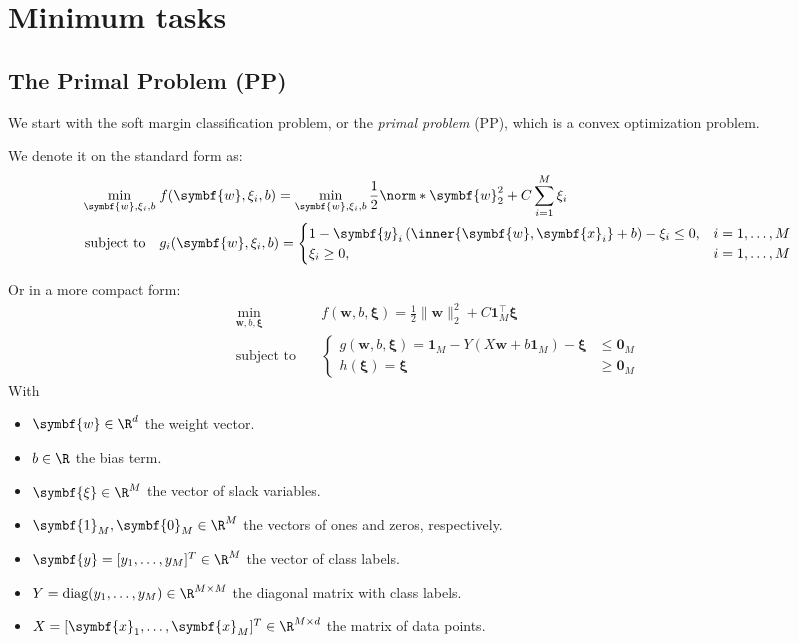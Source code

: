 \chapter{Minimum tasks}
\section{The Primal Problem (PP)}

We start with the soft margin classification problem, or the \emph{primal problem} (PP), which is a convex optimization problem.

We denote it on the standard form as:
\begin{align}\label{eq:primal-problem}
  \min_{\symbf{w}, \xi_i, b} \; & f(\symbf{w}, \xi_i, b) =  \min_{\symbf{w}, \xi_i, b} \frac{1}{2} \norm*{\symbf{w}}_2^2 + C \sum_{i=1}^M \xi_i \\
  \text{subject to} \quad       & g_i(\symbf{w},\xi_i, b) =
  \begin{cases}
    1 - \symbf{y}_i\left(\inner{\symbf{w}, \symbf{x}_i} + b\right) - \xi_i \leq 0, & i = 1, \ldots, M \\
    \xi_i \geq 0,                                                                  & i = 1, \ldots, M
  \end{cases}
\end{align}

Or in a more compact form:
\begin{align*}
  \min_{\symbf{w}, b, \symbf{\xi}} \quad & f(\symbf{w}, b, \symbf{\xi}) = \frac{1}{2}\|\symbf{w}\|_2^2 + C\symbf{1}_M^\top \symbf{\xi} \\
  \text{subject to} \quad                &
  \begin{cases}
    g(\symbf{w}, b, \symbf{\xi}) = \symbf{1}_M - Y(X\symbf{w} + b\symbf{1}_M) - \symbf{\xi} & \leq \symbf{0}_M \\
    h(\symbf{\xi}) = \symbf{\xi}                                                            & \geq \symbf{0}_M
  \end{cases}
\end{align*}
With
\begin{itemize}
  \item $\symbf{w} \in \R^d$ the weight vector.
  \item $b \in \R$ the bias term.
  \item $\symbf{\xi} \in \R^M$ the vector of slack variables.
  \item $\symbf{1}_M, \symbf{0}_M \in \R^M$ the vectors of ones and zeros, respectively.
  \item $\symbf{y} = [y_1, \ldots, y_M]^T \in \R^M$ the vector of class labels.
  \item $Y = \text{diag}(y_1, \ldots, y_M) \in \R^{M \times M}$ the diagonal matrix with class labels.
  \item $X = [\symbf{x}_1, \ldots, \symbf{x}_M]^T \in \R^{M \times d}$ the matrix of data points.
\end{itemize}

